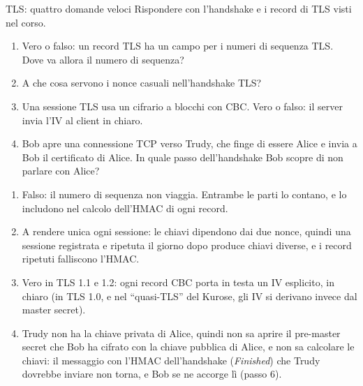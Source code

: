 \begin{esercizio}{TLS: quattro domande veloci}
Rispondere con l'handshake e i record di TLS visti nel corso.
\begin{enumerate}[label=(\alph*)]
    \item Vero o falso: un record TLS ha un campo per i numeri di sequenza TLS. Dove va allora il numero di sequenza?
    \item A che cosa servono i nonce casuali nell'handshake TLS?
    \item Una sessione TLS usa un cifrario a blocchi con CBC. Vero o falso: il server invia l'IV al client in chiaro.
    \item Bob apre una connessione TCP verso Trudy, che finge di essere Alice e invia a Bob il certificato di Alice. In quale passo
          dell'handshake Bob scopre di non parlare con Alice?
\end{enumerate}

\svolgimento
\begin{enumerate}[label=(\alph*)]
    \item Falso: il numero di sequenza non viaggia. Entrambe le parti lo contano, e lo includono nel calcolo dell'HMAC di ogni record.
    \item A rendere unica ogni sessione: le chiavi dipendono dai due nonce, quindi una sessione registrata e ripetuta il giorno dopo produce
          chiavi diverse, e i record ripetuti falliscono l'HMAC.
    \item Vero in TLS 1.1 e 1.2: ogni record CBC porta in testa un IV esplicito, in chiaro (in TLS 1.0, e nel ``quasi-TLS'' del Kurose, gli
          IV si derivano invece dal master secret).
    \item Trudy non ha la chiave privata di Alice, quindi non sa aprire il pre-master secret che Bob ha cifrato con la chiave pubblica di
          Alice, e non sa calcolare le chiavi: il messaggio con l'HMAC dell'handshake (\emph{Finished}) che Trudy dovrebbe inviare non torna,
          e Bob se ne accorge lì (passo 6).
\end{enumerate}
\end{esercizio}

